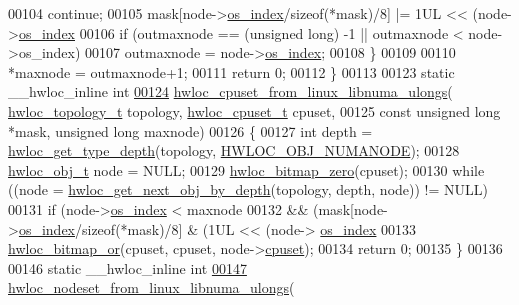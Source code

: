 \begin{DoxyCode}
00104       \textcolor{keywordflow}{continue};
00105     mask[node->\hyperlink{a00238_a61a7a80a68eaccbaaa28269e678c81a9}{os\_index}/\textcolor{keyword}{sizeof}(*mask)/8] |= 1UL << (node->\hyperlink{a00238_a61a7a80a68eaccbaaa28269e678c81a9}{os\_index} %
00106     \textcolor{keywordflow}{if} (outmaxnode == (\textcolor{keywordtype}{unsigned} \textcolor{keywordtype}{long}) -1 || outmaxnode < node->os\_index)
00107       outmaxnode = node->\hyperlink{a00238_a61a7a80a68eaccbaaa28269e678c81a9}{os\_index};
00108   \}
00109 
00110   *maxnode = outmaxnode+1;
00111   \textcolor{keywordflow}{return} 0;
00112 \}
00113 
00123 \textcolor{keyword}{static} \_\_hwloc\_inline \textcolor{keywordtype}{int}
\hyperlink{a00215_ga0e9d051e068940f722f6fdc61814149d}{00124} \hyperlink{a00215_ga0e9d051e068940f722f6fdc61814149d}{hwloc\_cpuset\_from\_linux\_libnuma\_ulongs}(
      \hyperlink{a00186_ga9d1e76ee15a7dee158b786c30b6a6e38}{hwloc\_topology\_t} topology, \hyperlink{a00183_ga4bbf39b68b6f568fb92739e7c0ea7801}{hwloc\_cpuset\_t} cpuset,
00125                                       \textcolor{keyword}{const} \textcolor{keywordtype}{unsigned} \textcolor{keywordtype}{long} *mask, \textcolor{keywordtype}{unsigned} \textcolor{keywordtype}{long} maxnode)
00126 \{
00127   \textcolor{keywordtype}{int} depth = \hyperlink{a00187_ga8bec782e21be313750da70cf7428b374}{hwloc\_get\_type\_depth}(topology, 
      \hyperlink{a00184_ggacd37bb612667dc437d66bfb175a8dc55a9d917a3e5497950c6d8948b8e183db5a}{HWLOC\_OBJ\_NUMANODE});
00128   \hyperlink{a00238}{hwloc\_obj\_t} node = NULL;
00129   \hyperlink{a00205_gaa97c5217613c8cae9862287170ea2132}{hwloc\_bitmap\_zero}(cpuset);
00130   \textcolor{keywordflow}{while} ((node = \hyperlink{a00187_gac140a9b939d9fa0b30c4a910efcb0656}{hwloc\_get\_next\_obj\_by\_depth}(topology, depth, node)) != NULL)
00131     \textcolor{keywordflow}{if} (node->\hyperlink{a00238_a61a7a80a68eaccbaaa28269e678c81a9}{os\_index} < maxnode
00132         && (mask[node->\hyperlink{a00238_a61a7a80a68eaccbaaa28269e678c81a9}{os\_index}/\textcolor{keyword}{sizeof}(*mask)/8] & (1UL << (node->
      \hyperlink{a00238_a61a7a80a68eaccbaaa28269e678c81a9}{os\_index} %
00133       \hyperlink{a00205_ga120b8aefb9ce7ef349929656359b1859}{hwloc\_bitmap\_or}(cpuset, cpuset, node->\hyperlink{a00238_a67925e0f2c47f50408fbdb9bddd0790f}{cpuset});
00134   \textcolor{keywordflow}{return} 0;
00135 \}
00136 
00146 \textcolor{keyword}{static} \_\_hwloc\_inline \textcolor{keywordtype}{int}
\hyperlink{a00215_gad8491c672eb2594cc5e7b0a026867192}{00147} \hyperlink{a00215_gad8491c672eb2594cc5e7b0a026867192}{hwloc\_nodeset\_from\_linux\_libnuma\_ulongs}(

\end{DoxyCode}

